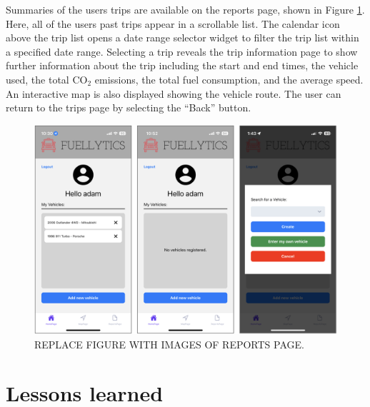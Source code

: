 \documentclass[11pt, oneside]{article}
\begin{document}
Summaries of the users trips are available on the reports page, shown in Figure \ref*{fig:reports}.  Here, all of the users past trips appear in a scrollable list. The calendar icon above the trip list opens a date range selector widget to filter the trip list within a specified date range. Selecting a trip reveals the trip information page to show further information about the trip including the start and end times, the vehicle used, the total CO$_2$ emissions, the total fuel consumption, and the average speed.  An interactive map is also displayed showing the vehicle route. The user can return to the trips page by selecting the ``Back'' button.
\begin{figure}[H]
\centerline{\includegraphics[width=16.5cm]{img/homepage.png}}
\caption{\label{fig:reports} REPLACE FIGURE WITH IMAGES OF REPORTS PAGE.}
\end{figure}


\section{Lessons learned}
\end{document}
